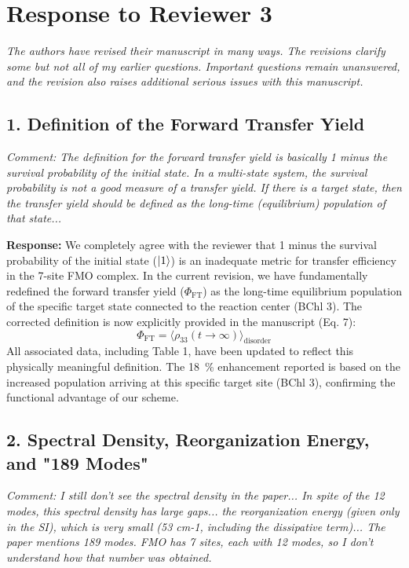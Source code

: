 \documentclass[11pt]{article}
\begin{document}
\section*{Response to Reviewer 3}

\textit{The authors have revised their manuscript in many ways. The revisions clarify some but not all of my earlier questions. Important questions remain unanswered, and the revision also raises additional serious issues with this manuscript.}

\subsection*{1. Definition of the Forward Transfer Yield}
\textit{Comment: The definition for the forward transfer yield is basically 1 minus the survival probability of the initial state. In a multi-state system, the survival probability is not a good measure of a transfer yield. If there is a target state, then the transfer yield should be defined as the long-time (equilibrium) population of that state...}

\textbf{Response:} We completely agree with the reviewer that 1 minus the survival probability of the initial state ($\ket{1}$) is an inadequate metric for transfer efficiency in the 7-site FMO complex. In the current revision, we have fundamentally redefined the forward transfer yield ($\Phi_{\mathrm{FT}}$) as the long-time equilibrium population of the specific target state connected to the reaction center (BChl 3). The corrected definition is now explicitly provided in the manuscript (Eq. 7):
\[ \Phi_{\mathrm{FT}} = \langle \rho_{33}(t \to \infty) \rangle_{\mathrm{disorder}} \]
All associated data, including Table 1, have been updated to reflect this physically meaningful definition. The \SI{18}{\percent} enhancement reported is based on the increased population arriving at this specific target site (BChl 3), confirming the functional advantage of our scheme.

\subsection*{2. Spectral Density, Reorganization Energy, and "189 Modes"}
\textit{Comment: I still don’t see the spectral density in the paper... In spite of the 12 modes, this spectral density has large gaps... the reorganization energy (given only in the SI), which is very small (53 cm-1, including the dissipative term)... The paper mentions 189 modes. FMO has 7 sites, each with 12 modes, so I don’t understand how that number was obtained.}
\end{document}
